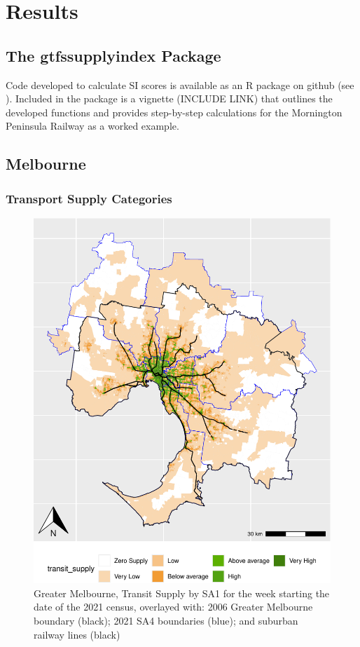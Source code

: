 \documentclass[preprint, 3p,
authoryear]{elsarticle} %
\begin{document}
\section{Results}\label{results}

\subsection{The gtfssupplyindex
Package}\label{the-gtfssupplyindex-package}

Code developed to calculate SI scores is available as an R package on
github (see \citet{gtfssupplyindex_github}). Included in the package is
a vignette (INCLUDE LINK) that outlines the developed functions and
provides step-by-step calculations for the Mornington Peninsula Railway
as a worked example.

\subsection{Melbourne}\label{melbourne}

\subsubsection{Transport Supply
Categories}\label{transport-supply-categories}

\begin{figure}
\centering
\includegraphics{Leveraging_GTFS_to_assess_transit_supply_Transport_Geography_files/figure-latex/Greater_Melbourne_2016_2021_plot-1.pdf}
\caption{Greater Melbourne, Transit Supply by SA1 for the week starting
the date of the 2021 census, overlayed with: 2006 Greater Melbourne
boundary (black); 2021 SA4 boundaries (blue); and suburban railway lines
(black)}
\end{figure}
\end{document}
